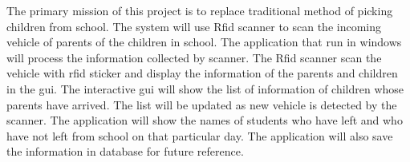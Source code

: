 \quad \quad The primary mission of this project is to replace traditional method of picking children from school. The system will use Rfid scanner to scan the incoming vehicle of parents of the children in school. The application that run in windows will process the information collected by scanner. The Rfid scanner scan the vehicle with rfid sticker and display the information of the parents and children in the gui. The interactive gui will show the list of information of children whose parents have arrived. The list will be updated as new vehicle is detected by the scanner. The application will show the names of students who have left and who have not left from school on that particular day. The application will also save the information in database for future reference.
